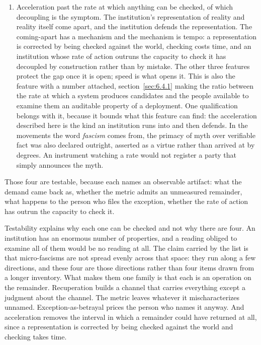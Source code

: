 \begin{enumerate}
  \item Acceleration past the rate at which anything can be checked, of which decoupling is the symptom. The institution's representation of reality and reality itself come apart, and the institution defends the representation. The coming-apart has a mechanism and the mechanism is tempo: a representation is corrected by being checked against the world, checking costs time, and an institution whose rate of action outruns the capacity to check it has decoupled by construction rather than by mistake. The other three features protect the gap once it is open; speed is what opens it. This is also the feature with a number attached, section~\ref{sec:6.4.1} making the ratio between the rate at which a system produces candidates and the people available to examine them an auditable property of a deployment. One qualification belongs with it, because it bounds what this feature can find: the acceleration described here is the kind an institution runs into and then defends. In the movements the word \textit{fascism} comes from, the primacy of myth over verifiable fact was also declared outright, asserted as a virtue rather than arrived at by degrees. An instrument watching a rate would not register a party that simply announces the myth.
\end{enumerate}

Those four are testable, because each names an observable artifact: what the demand came back as, whether the metric admits an unmeasured remainder, what happens to the person who files the exception, whether the rate of action has outrun the capacity to check it.

Testability explains why each one can be checked and not why there are four. An institution has an enormous number of properties, and a reading obliged to examine all of them would be no reading at all. The claim carried by the list is that micro-fascisms are not spread evenly across that space: they run along a few directions, and these four are those directions rather than four items drawn from a longer inventory. What makes them one family is that each is an operation on the remainder. Recuperation builds a channel that carries everything except a judgment about the channel. The metric leaves whatever it mischaracterizes unnamed. Exception-as-betrayal prices the person who names it anyway. And acceleration removes the interval in which a remainder could have returned at all, since a representation is corrected by being checked against the world and checking takes time.

